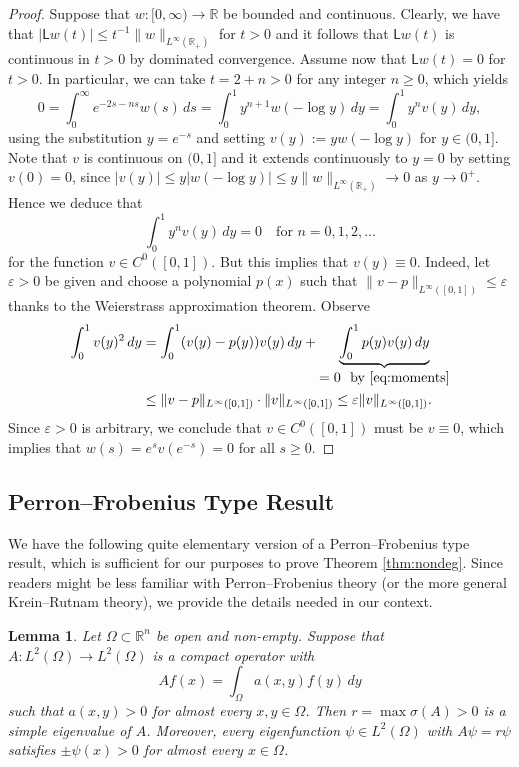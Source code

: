 \documentclass[reqno,10pt,a4paper]{amsart}
\newtheorem{lem}{Lemma}[section]
\theoremstyle{definition}
\theoremstyle{definition}
\theoremstyle{remark}
\theoremstyle{remark}
\numberwithin{equation}{section}
\newcommand{\R}{\mathbb{R}}
\newcommand{\be}{\begin{equation}}
\newcommand{\ee}{\end{equation}}
\newcommand{\eps}{\varepsilon}
\begin{document}
\begin{appendix}
\begin{proof}
Suppose that $w : [0,\infty) \to \R$ be bounded and continuous. Clearly, we have that $|\mathsf{L}w(t)| \leq t^{-1} \| w \|_{L^\infty(\R_+)}$ for $t > 0$ and it follows that $\mathsf{L}w(t)$ is continuous in $t > 0$ by dominated convergence. Assume now that $\mathsf{L}w(t) = 0$ for $t > 0$. In particular, we can take $t=2 + n>0$ for any integer $n \geq 0$, which yields
$$
0 = \int_0^\infty e^{-2s-ns} w(s) \, ds = \int_0^1 y^{n+1} w(- \! \log y) \, dy = \int_0^1 y^n v(y) \, dy,
$$
using the substitution $y=e^{-s}$ and setting $v(y) := y w(- \! \log y)$ for $y \in (0,1]$. Note that $v$ is continuous on $(0,1]$ and it extends continuously to $y=0$ by setting $v(0)=0$, since $|v(y)| \leq y |w(- \! \log y)| \leq y \| w \|_{L^\infty(\R_+)}  \to 0$ as $y \to 0^+$. Hence we deduce that
\be \label{eq:moments}
\int_0^1 y^n v(y) \, dy = 0 \quad \mbox{for $n=0,1,2,\ldots$}
\ee
for the function $v \in C^0([0,1])$. But this implies that $v(y) \equiv 0$. Indeed, let $\eps > 0$ be given and choose a polynomial $p(x)$ such that $\|v-p\|_{L^\infty([0,1])} \leq \eps$ thanks to the Weierstrass approximation theorem. Observe 
\begin{align*}
\int_0^1 v(y)^2 \, dy & = \int_0^1(v(y)-p(y))v(y) \, dy + \underbrace{\int_0^1 p(y) v(y) \, dy}_{\displaystyle =0 \ \ \mbox{by \eqref{eq:moments}}} \\
& \leq \| v-p \|_{L^\infty([0,1])} \cdot \| v \|_{L^\infty([0,1])} \leq \eps \| v \|_{L^\infty([0,1])}.
\end{align*}
Since $\eps > 0$ is arbitrary, we conclude that $v \in C^0([0,1])$ must be $v \equiv 0$, which implies that $w(s) = e^{s} v(e^{-s}) = 0$ for all $s \geq 0$. 
\end{proof}

\subsection{Perron--Frobenius Type Result}

We have the following quite elementary version of a Perron--Frobenius type result, which is sufficient for our purposes to prove Theorem \ref{thm:nondeg}. Since readers might be less familiar with Perron--Frobenius theory (or the more general Krein--Rutnam theory), we provide the details needed in our context.
 
\begin{lem} \label{lem:perron}
Let $\Omega \subset \R^n$ be open and non-empty. Suppose that $A : L^2(\Omega) \to L^2(\Omega)$ is a compact operator with
$$
Af(x) = \int_{\Omega} a(x,y) f(y) \, dy
$$
such that $a(x,y) > 0$ for almost every $x,y \in \Omega$. Then $r = \max \sigma(A) >0$ is a simple eigenvalue of $A$. Moreover, every eigenfunction $\psi \in L^2(\Omega)$ with $A\psi = r \psi$ satisfies $\pm \psi(x) > 0$ for almost every $x \in \Omega$. 
\end{lem}


\end{appendix}
\end{document}
